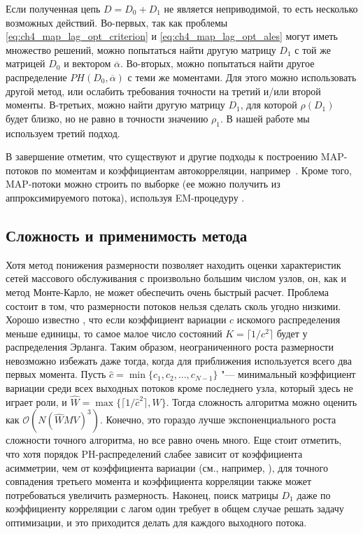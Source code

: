 Если полученная цепь $D = D_0 + D_1$ не является неприводимой, то есть несколько возможных действий. Во-первых, так как проблемы \eqref{eq:ch4_map_lag_opt_criterion} и \eqref{eq:ch4_map_lag_opt_ales} могут иметь множество решений, можно попытаться найти другую матрицу $D_1$ с той же матрицей $D_0$ и вектором $\overline{\alpha}$. Во-вторых, можно попытаться найти другое распределение $PH(D_0, \overline{\alpha})$ с теми же моментами. Для этого можно использовать другой метод, или ослабить требования точности на третий и/или второй моменты. В-третьих, можно найти другую матрицу $D_1$, для которой $\rho(D_1)$ будет близко, но не равно в точности значению $\rho_1$. В нашей работе мы используем третий подход.

В завершение отметим, что существуют и другие подходы к построению MAP-потоков по моментам и коэффициентам автокорреляции, например~\cite{TelekHorvath2007,Bodrog2010}. Кроме того, MAP-потоки можно строить по выборке (ее можно получить из аппроксимируемого потока), используя EM-процедуру \cite{Horvath2013,Ephraim2009,Buchholz2003}.


\subsection{Сложность и применимость метода}\label{sec:ch4_approx_complexity}

Хотя метод понижения размерности позволяет находить оценки характеристик сетей массового обслуживания с произвольно большим числом узлов, он, как и метод Монте-Карло, не может обеспечить очень быстрый расчет. Проблема состоит в том, что размерности потоков нельзя сделать сколь угодно низкими. Хорошо известно \cite{Aldous1987}, что если коэффициент вариации $c$ искомого распределения меньше единицы, то самое малое число состояний $K = \lceil 1 / c^2 \rceil $ будет у распределения Эрланга. Таким образом, неограниченного роста размерности невозможно избежать даже тогда, когда для приближения используется всего два первых момента. Пусть $\hat{c} = \min\{c_1, c_2, \dots, c_{N-1}\}$ "--- минимальный коэффициент вариации среди всех выходных потоков кроме последнего узла, который здесь не играет роли, и $\hat{W} = \max\{\lceil 1 / \hat{c}^2 \rceil, W\}$. Тогда сложность алгоритма можно оценить как $\mathcal{O}(N (\hat{W}MV)^3 )$. Конечно, это гораздо лучше экспоненциального роста сложности точного алгоритма, но все равно очень много. Еще стоит отметить, что хотя порядок PH-распределений слабее зависит от коэффициента асимметрии, чем от коэффициента вариации (см., например, \cite{Johnson1989}), для точного совпадения третьего момента и коэффициента корреляции также может потребоваться увеличить размерность. Наконец, поиск матрицы $D_1$ даже по коэффициенту корреляции с лагом один требует в общем случае решать задачу оптимизации, и это приходится делать для каждого выходного потока.




